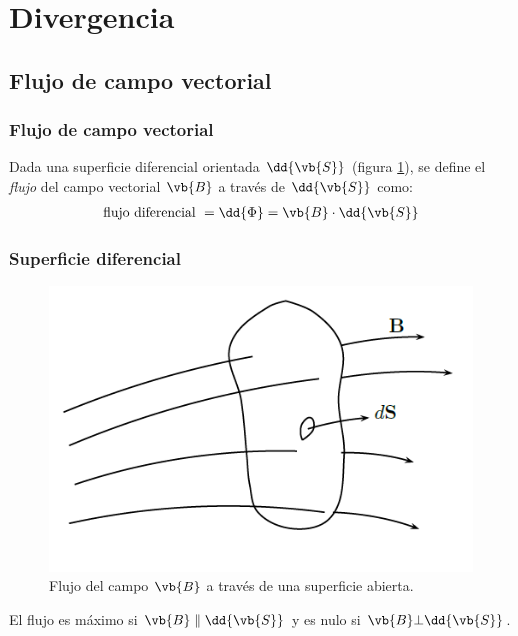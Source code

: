 \section{Divergencia}
\subsection{Flujo de campo vectorial}
\begin{frame}
\frametitle{Flujo de campo vectorial}
Dada una superficie diferencial orientada $\dd{\vb{S}}$ (figura \ref{fig:figura_superficie_diferencial}), se define el \emph{flujo} del campo vectorial $\vb{B}$ a través de $\dd{\vb{S}}$ como:
\begin{align*}
\mbox{flujo diferencial } = \dd{\Phi} = \vb{B} \cdot \dd{\vb{S}}
\end{align*}
\end{frame}
\begin{frame}
\frametitle{Superficie diferencial}
\begin{minipage}{0.45\linewidth}
\begin{figure}[h!]
    \centering
    \includegraphics[scale=0.4]{Imagenes/Superficie_Diferencial.png}
    \caption{Flujo del campo $\vb{B}$ a través de una superficie abierta.}
    \label{fig:figura_superficie_diferencial}
\end{figure}
\end{minipage}
\hspace{1.5cm}
\pause
\begin{minipage}{0.3\linewidth}
\fontsize{12}{12} \selectfont
El flujo es máximo si $\vb{B} \parallel \dd{\vb{S}}$ y es nulo si $\vb{B} \bot \dd{\vb{S}}$.
\end{minipage}
\end{frame}
